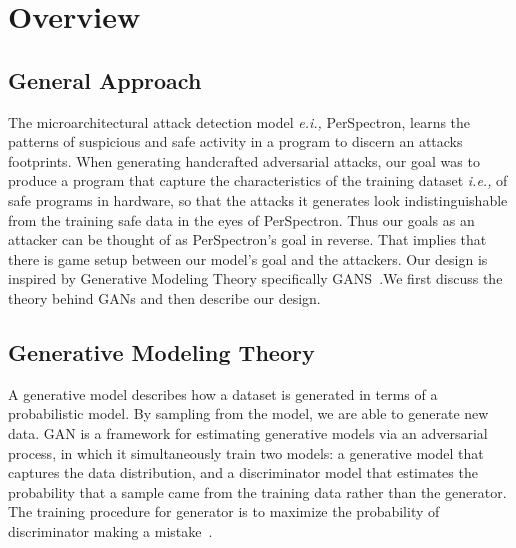 \section{ Overview}\label{overview}
\subsection{General Approach}

 The microarchitectural attack detection model {\em e.i.,} PerSpectron, learns the patterns of suspicious and safe activity in a program to discern an attacks footprints.
When generating handcrafted adversarial attacks, our goal was to produce a program that capture the characteristics of the training dataset {\em i.e., } of safe programs in hardware, so that the attacks it generates look indistinguishable from the training safe data in the eyes of PerSpectron. Thus our goals as an attacker can be thought of as PerSpectron's goal in reverse. That implies that there is game setup between our model's goal and the attackers. Our design is inspired by Generative Modeling Theory specifically GANS~\cite{goodfellow2014generative}.We first discuss the theory behind GANs and then describe our design.  


\subsection{Generative Modeling Theory}
A generative model describes how a dataset is generated in
terms of a probabilistic model. By sampling from the model,
we are able to generate new data. GAN is a framework for
estimating generative models via an adversarial process, in
which it simultaneously train two models: a generative model
that captures the data distribution, and a discriminator model
that estimates the probability that a sample came from the
training data rather than the generator. The training procedure
for generator is to maximize the probability of discriminator
making a mistake~\cite{goodfellow2014generative}.



